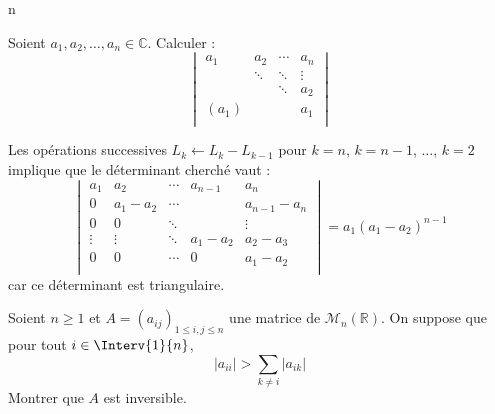 n\documentclass[a4paper,10pt]{report}
\begin{document}
\begin{Exa} Soient $a_1 ,a_2 , \ldots ,a_n \in \mathbb{C}$. Calculer :
    \[
    \begin{vmatrix}
        {a_1} & {a_2} & \cdots & {a_n} \\
        {} & \ddots & \ddots & \vdots \\
        {} & {} & \ddots & {a_2} \\
        {(a_1)} & {} & {} & {a_1} \\
    \end{vmatrix}
    \]
\end{Exa}

\corr Les opérations successives $L_k \leftarrow L_k - L_{k-1}$ pour $k=n$, $k=n-1$, $\ldots$, $k=2$ implique que le déterminant cherché vaut :
$$  \begin{vmatrix}
        {a_1} & {a_2} & \cdots & a_{n-1} & {a_n} \\
        0 &  a_1-a_2 & \cdots & & a_{n-1}-a_n \\
         0& 0& \ddots & & \vdots\\
        \vdots & \vdots & \ddots& a_1-a_2 & {a_2-a_3} \\
        0 & 0 & \cdots  & 0& {a_1-a_2} \\
    \end{vmatrix} = a_1 (a_1-a_2)^{n-1}$$
 car ce déterminant est triangulaire.
 
 \begin{Exa} Soient $n \geq 1$ et $A = (a_{ij})_{1 \leq i,j \leq n}$ une matrice de $\mathcal{M}_n(\mathbb{R})$. On suppose que pour tout $i \in \Interv{1}{n}$,
$$ \vert a_{ii} \vert > \sum_{k \neq i} \vert a_{ik} \vert $$
Montrer que $A$ est inversible.
\end{Exa}
\end{document}
